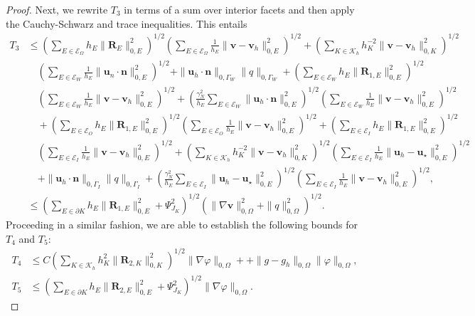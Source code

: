 \documentclass[10pt,a4paper]{article}
\begin{document}
\begin{proof}
Next, we rewrite \( T_3 \) in terms of a sum over interior facets and then apply the Cauchy-Schwarz and trace inequalities. This entails
\begin{align*}
    T_3 
    &\leq \left( \sum_{E \in \mathcal{E}_{\Omega}}  h_E \|\boldsymbol{R}_E\|^2_{0,E}\right)^{1/2} \left( \sum_{E \in \mathcal{E}_{\Omega}} \frac{1}{h_E}  \|\boldsymbol{v}-\boldsymbol{v}_h\|_{0,E}^2 \right)^{1/2} + \left(\sum_{K \in \mathcal{K}_h} h_K^{-2} \|\boldsymbol{v} - \boldsymbol{v}_h \|^2_{0,K} \right)^{1/2} \\
    &\quad   \left( \sum_{E \in \mathcal{E}_{W}} \frac{1}{h_E} \| \boldsymbol{u}_n \cdot \boldsymbol{n} \|^2_{0,E} \right)^{1/2}  + \| \boldsymbol{u}_h \cdot \boldsymbol{n} \|_{0,\Gamma_W} \|q\|_{0,\Gamma_W}  + \left( \sum_{E \in \mathcal{E}_W} h_E \| \boldsymbol{R}_{1,E} \|_{0,E}^2 \right)^{1/2} \\
    &\quad  \left( \sum_{E \in \mathcal{E}_W} \frac{1}{h_E}  \|\boldsymbol{v} - \boldsymbol{v}_h \|_{0,E}^2\right)^{1/2}  + \left(\frac{\gamma_N^2 } {h_E} \sum_{E \in \mathcal{E}_W}  \|\boldsymbol{u}_h \cdot \boldsymbol{n} \|^2_{0,E} \right)^{1/2}  \left(\sum_{E \in \mathcal{E}_W}  \frac{1}{h_E}  \|\boldsymbol{v} - \boldsymbol{v}_h \|_{0,E}^2 \right)^{1/2} \\ & \quad + \left( \sum_{E \in \mathcal{E}_O} h_E \| \boldsymbol{R}_{1,E} \|_{0,E}^2 \right)^{1/2}  \left( \sum_{E \in \mathcal{E}_O} \frac{1}{h_E}  \|\boldsymbol{v} - \boldsymbol{v}_h \|_{0,E}^2\right)^{1/2} +  \left( \sum_{E \in \mathcal{E}_I} h_E \| \boldsymbol{R}_{1,E} \|_{0,E}^2 \right)^{1/2} \\& \quad  \left( \sum_{E \in \mathcal{E}_I} \frac{1}{h_E}  \|\boldsymbol{v} - \boldsymbol{v}_h \|_{0,E}^2\right)^{1/2} + \left(\sum_{K \in \mathcal{K}_h} h_K^{-2} \|\boldsymbol{v} - \boldsymbol{v}_h \|^2_{0,K} \right)^{1/2}    \left( \sum_{E \in \mathcal{E}_{I}} \frac{1}{h_E} \| \boldsymbol{u}_h - \boldsymbol{u}_{\star} \|^2_{0,E} \right)^{1/2} \\& \quad 
    + \| \boldsymbol{u}_h \cdot \boldsymbol{n} \|_{0,\Gamma_I} \|q\|_{0,\Gamma_I} + \left(\frac{\gamma_N^2 } {h_E} \sum_{E \in \mathcal{E}_I}  \|\boldsymbol{u}_h -  \boldsymbol{u}_{\star} \|^2_{0,E} \right)^{1/2}  \left(\sum_{E \in \mathcal{E}_I}  \frac{1}{h_E}  \|\boldsymbol{v} - \boldsymbol{v}_h \|_{0,E}^2 \right)^{1/2}, 
    \\ & \leq \left(\sum_{E \in \partial K}  h_E \|\boldsymbol{R}_{1,E}\|^2_{0,E} +  \Psi_{J_K}^2 \right)^{1/2}  \left( \| \nabla \boldsymbol{v}\|_{0,\Omega}^2 + \|q\|^2_{0,\Omega}  \right)^{1/2}.
\end{align*}
Proceeding in a similar fashion, we are able to establish the following bounds for $T_4$ and $T_5$:
\begin{align*}
    T_4 & \leq  C \left( \sum_{K \in \mathcal{K}_h} h_K^2\| \boldsymbol{R}_{2,K} \|_{0,K}^2 \right)^{1/2} \| \nabla \varphi\|_{0,\Omega} + + \| g -g_h\|_{0,\Omega} \|\varphi\|_{0,\Omega}, \\
    T_5  & \leq  \left(\sum_{E \in \partial K}  h_E \|\boldsymbol{R}_{2,E}\|^2_{0,E} +  \Psi_{J_K}^2 \right)^{1/2}  \| \nabla \varphi \|_{0,\Omega}.
\end{align*}
\end{proof}
\end{document}
